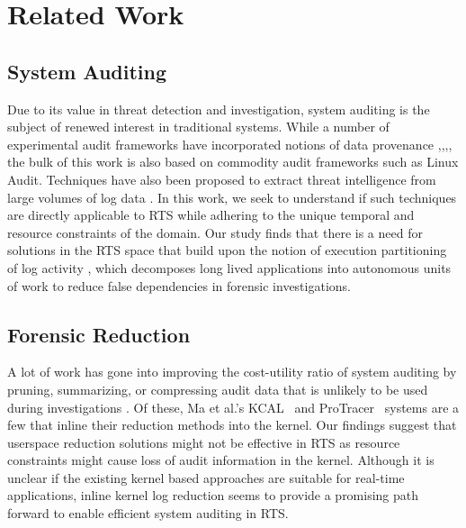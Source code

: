 \section{Related Work}

\subsection{System Auditing}
Due to its value in threat detection and investigation, system auditing is the subject of renewed interest in traditional systems. While a number of experimental audit frameworks have incorporated notions of data provenance \cite{Bates2015},\cite{Pasquier2017b},\cite{Pohly2012},\cite{Pasquier2017a}, the bulk of this work is also based on commodity audit frameworks such as Linux Audit. Techniques have also been proposed to extract threat intelligence from large volumes of log data \cite{Pei2016,203676,Kwon2018,Hassan2019}. In this work, we seek to understand if such techniques are directly applicable to RTS while adhering to the unique temporal and resource constraints of the domain. Our study finds that there is a need for solutions in the RTS space that build upon the notion of execution partitioning of log activity \cite{Kwon2018,Hassan2019,Hassan2020,Ma2017,Lee2013a}, which decomposes long lived applications into autonomous units of work to reduce false dependencies in forensic investigations.


\subsection{Forensic Reduction}
 A lot of work has gone into improving the cost-utility ratio of system auditing by pruning, summarizing, or compressing audit data that is unlikely to be used during investigations \cite{Tang2018,Xu2016,Ma2015,Ben2018,Hassan2018a,Bates2015a,Bates2017b,Hossain2018,Lee2013}. Of these, Ma et al.'s KCAL~\cite{Ma2018} and ProTracer~\cite{Ma2016} systems are a few that inline their reduction methods into the kernel. Our findings suggest that userspace reduction solutions might not be effective in RTS as resource constraints might cause loss of audit information in the kernel. Although it is unclear if the existing kernel based approaches are suitable for real-time applications, inline kernel log reduction seems to provide a promising path forward to enable efficient system auditing in RTS.

